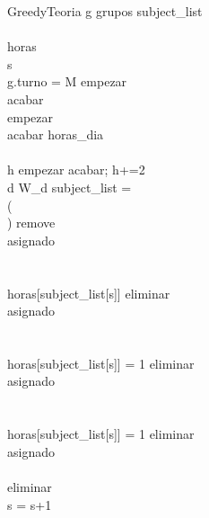 \begin{pseudocode}{GreedyTeoria}{ }
\label{greedyteoria}
\FOREACH g \in grupos
\BEGIN
  subject\_list \GETS {}\\
  \\
  horas \GETS {}\\
  s \\

  \IF g.turno = M \THEN
  \BEGIN
    empezar  \\
    acabar \GETS {}\\
  \END
  \ELSE 
  \BEGIN
    empezar \GETS {}\\
    acabar \GETS horas\_dia\\
  \END\\

  \FOR h \GETS empezar \TO acabar; h+=2\\
  \BEGIN
    \FOR d  \TO W_d
    \BEGIN
      \IF subject\_list = \emptyset \THEN
      \BREAK\\

      \ELSEIF \NOT ( \AND \\ \;\;\; ) \THEN
      \BEGIN
        remove \GETS \FALSE\\
        asignado \GETS \FALSE\\
      \END\\

      \ELSEIF {} \AND \\ \;\;\; horas[subject\_list[s]]  \THEN
      \BEGIN
        eliminar \GETS {}\\
        asignado \GETS \TRUE\\
      \END\\

      \ELSEIF {} \AND \\ \;\;\; horas[subject\_list[s]] = 1 \THEN
      \BEGIN
        eliminar \GETS {}\\
        asignado \GETS \TRUE\\
      \END\\
      \ELSEIF {} \AND \\ \;\;\; horas[subject\_list[s]] = 1 \THEN
      \BEGIN
        eliminar \GETS {}\\
        asignado \GETS \TRUE\\
      \END\\

      \IF eliminar \THEN {}\\
      \ELSE s = s+1 \\
    \END
  \END 
\END
\end{pseudocode}

